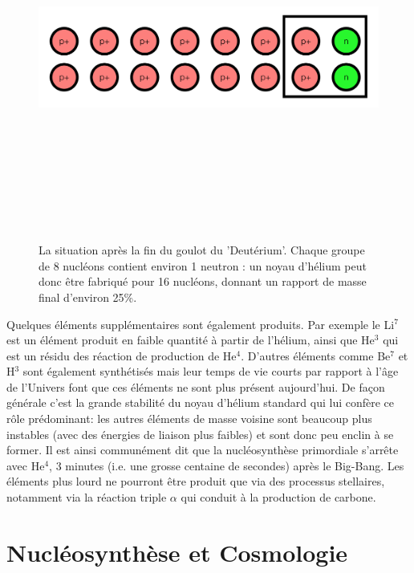 \begin{figure}[htbp]
	\centering
		\includegraphics[height=12cm]{figs/helium.png}
	\caption{La situation après la fin du goulot du 'Deutérium'. Chaque groupe de 8 nucléons contient environ 1 neutron : un noyau d'hélium peut donc être fabriqué pour 16 nucléons, donnant un rapport de masse final d'environ 25\%.}
	\label{f:helium}
\end{figure}

Quelques éléments supplémentaires sont également produits. Par exemple le Li$^7$ est un élément produit en faible quantité à partir de l'hélium, ainsi que He$^3$ qui est un résidu des réaction de production de He$^4$. D'autres éléments comme Be$^7$ et H$^3$ sont également synthétisés mais leur temps de vie courts par rapport à l'âge de l'Univers font que ces éléments ne sont plus présent aujourd'hui. De façon générale c'est la grande stabilité du noyau d'hélium standard qui lui confère ce rôle prédominant: les autres éléments de masse voisine sont beaucoup plus instables (avec des énergies de liaison plus faibles) et sont donc peu enclin à se former. Il est ainsi communément dit que la nucléosynthèse primordiale s'arrête avec He$^4$, 3 minutes (i.e. une grosse centaine de secondes) après le Big-Bang. Les éléments plus lourd ne pourront être produit que via des processus stellaires, notamment via la réaction triple $\alpha$ qui conduit à la production de carbone.

\section{Nucléosynthèse et Cosmologie}

